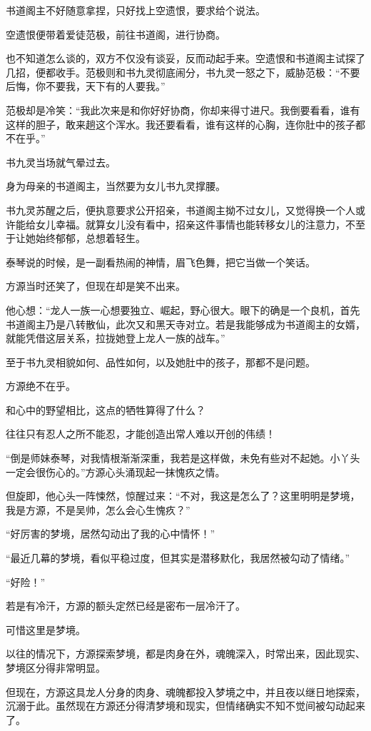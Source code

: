 \begin{this_body}
书道阁主不好随意拿捏，只好找上空遗恨，要求给个说法。

空遗恨便带着爱徒范极，前往书道阁，进行协商。

也不知道怎么谈的，双方不仅没有谈妥，反而动起手来。空遗恨和书道阁主试探了几招，便都收手。范极则和书九灵彻底闹分，书九灵一怒之下，威胁范极：“不要后悔，你不要我，天下有的人要我。”

范极却是冷笑：“我此次来是和你好好协商，你却来得寸进尺。我倒要看看，谁有这样的胆子，敢来趟这个浑水。我还要看看，谁有这样的心胸，连你肚中的孩子都不在乎。”

书九灵当场就气晕过去。

身为母亲的书道阁主，当然要为女儿书九灵撑腰。

书九灵苏醒之后，便执意要求公开招亲，书道阁主拗不过女儿，又觉得换一个人或许能给女儿幸福。就算女儿没有看中，招亲这件事情也能转移女儿的注意力，不至于让她始终郁郁，总想着轻生。

泰琴说的时候，是一副看热闹的神情，眉飞色舞，把它当做一个笑话。

方源当时还笑了，但现在却是笑不出来。

他心想：“龙人一族一心想要独立、崛起，野心很大。眼下的确是一个良机，首先书道阁主乃是八转散仙，此次又和黑天寺对立。若是我能够成为书道阁主的女婿，就能凭借这层关系，拉拢她登上龙人一族的战车。”

至于书九灵相貌如何、品性如何，以及她肚中的孩子，那都不是问题。

方源绝不在乎。

和心中的野望相比，这点的牺牲算得了什么？

往往只有忍人之所不能忍，才能创造出常人难以开创的伟绩！

“倒是师妹泰琴，对我情根渐渐深重，我若是这样做，未免有些对不起她。小丫头一定会很伤心的。”方源心头涌现起一抹愧疚之情。

但旋即，他心头一阵悚然，惊醒过来：“不对，我这是怎么了？这里明明是梦境，我是方源，不是吴帅，怎么会心生愧疚？”

“好厉害的梦境，居然勾动出了我的心中情怀！”

“最近几幕的梦境，看似平稳过度，但其实是潜移默化，我居然被勾动了情绪。”

“好险！”

若是有冷汗，方源的额头定然已经是密布一层冷汗了。

可惜这里是梦境。

以往的情况下，方源探索梦境，都是肉身在外，魂魄深入，时常出来，因此现实、梦境区分得非常明显。

但现在，方源这具龙人分身的肉身、魂魄都投入梦境之中，并且夜以继日地探索，沉溺于此。虽然现在方源还分得清梦境和现实，但情绪确实不知不觉间被勾动起来了。


\end{this_body}
